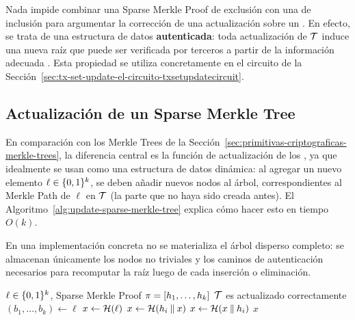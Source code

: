 Nada impide combinar una Sparse Merkle Proof de exclusión con una de inclusión para argumentar la corrección de una actualización sobre un \SMT. En efecto, se trata de una estructura de datos \textbf{autenticada}: toda actualización de $\mathcal{T}$ induce una nueva raíz que puede ser verificada por terceros a partir de la información adecuada \cite{Miller2014}. Esta propiedad se utiliza concretamente en el circuito \TxSetUpdateCircuit de la Sección~\ref{sec:tx-set-update-el-circuito-txsetupdatecircuit}.

\subsection{Actualización de un Sparse Merkle Tree}
\label{subsec:apendice-a-sparse-merkle-tree-actualizacion-de-un-sparse-merkle-tree}

En comparación con los Merkle Trees de la Sección~\ref{sec:primitivas-criptograficas-merkle-trees}, la diferencia central es la función de actualización de los \SMT, ya que idealmente se usan como una estructura de datos dinámica: al agregar un nuevo elemento $\ell \in \{0,1\}^{k}$, se deben añadir nuevos nodos al árbol, correspondientes al Merkle Path de $\ell$ en $\mathcal{T}$ (la parte que no haya sido creada antes). El Algoritmo~\ref{alg:update-sparse-merkle-tree} explica cómo hacer esto en tiempo $O(k)$.

En una implementación concreta no se materializa el árbol disperso completo: se almacenan únicamente los nodos no triviales y los caminos de autenticación necesarios para recomputar la raíz luego de cada inserción o eliminación.

\begin{algorithm}[ht]
	\caption{Actualización de una hoja en un Sparse Merkle Tree}
	\label{alg:update-sparse-merkle-tree}
	\begin{algorithmic}[1]
		\Require $\ell \in \{0,1\}^{k}$, Sparse Merkle Proof $\pi = [h_1, \ldots, h_k]$
		\Ensure $\mathcal{T}$ es actualizado correctamente
		\State $(b_1, \ldots, b_k) \gets \ell$ 
		\State $x \gets \mathcal{H}(\ell)$
				\State $x \gets \mathcal{H}(h_i \mathbin{\|} x)$
			\Else
				\State $x \gets \mathcal{H}(x \mathbin{\|} h_i)$
			\EndIf
			\State {}
		\EndFor
		\State \Return $x$
	\end{algorithmic}
\end{algorithm}

